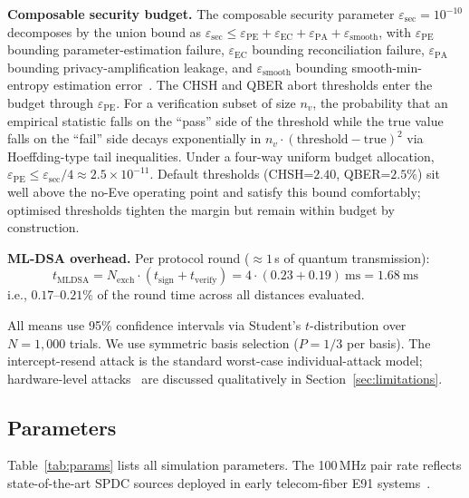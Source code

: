 \documentclass[conference]{IEEEtran}
\begin{document}
\textbf{Composable security budget.} The composable security parameter $\varepsilon_{\mathrm{sec}} = 10^{-10}$ decomposes by the union bound as $\varepsilon_{\mathrm{sec}} \leq \varepsilon_{\mathrm{PE}} + \varepsilon_{\mathrm{EC}} + \varepsilon_{\mathrm{PA}} + \varepsilon_{\mathrm{smooth}}$, with $\varepsilon_{\mathrm{PE}}$ bounding parameter-estimation failure, $\varepsilon_{\mathrm{EC}}$ bounding reconciliation failure, $\varepsilon_{\mathrm{PA}}$ bounding privacy-amplification leakage, and $\varepsilon_{\mathrm{smooth}}$ bounding smooth-min-entropy estimation error~\cite{lim2014,tomamichel2012}. The CHSH and QBER abort thresholds enter the budget through $\varepsilon_{\mathrm{PE}}$. For a verification subset of size $n_v$, the probability that an empirical statistic falls on the ``pass'' side of the threshold while the true value falls on the ``fail'' side decays exponentially in $n_v \cdot (\mathrm{threshold} - \mathrm{true})^2$ via Hoeffding-type tail inequalities. Under a four-way uniform budget allocation, $\varepsilon_{\mathrm{PE}} \leq \varepsilon_{\mathrm{sec}}/4 \approx 2.5 \times 10^{-11}$. Default thresholds (CHSH=$2.40$, QBER=$2.5\%$) sit well above the no-Eve operating point and satisfy this bound comfortably; optimised thresholds tighten the margin but remain within budget by construction.

\textbf{ML-DSA overhead.} Per protocol round ($\approx 1$\,s of quantum transmission):
\begin{equation}
t_{\mathrm{MLDSA}} = N_{\mathrm{exch}} \cdot (t_{\mathrm{sign}} + t_{\mathrm{verify}}) = 4 \cdot (0.23 + 0.19)~\mathrm{ms} = 1.68~\mathrm{ms} \label{eq:mldsa}
\end{equation}
i.e., $0.17$--$0.21\%$ of the round time across all distances evaluated.

All means use 95\% confidence intervals via Student's $t$-distribution over $N = 1{,}000$ trials. We use symmetric basis selection ($P = 1/3$ per basis). The intercept-resend attack is the standard worst-case individual-attack model; hardware-level attacks~\cite{lydersen2010,makarov2009} are discussed qualitatively in Section~\ref{sec:limitations}.

\subsection{Parameters}
Table~\ref{tab:params} lists all simulation parameters. The 100\,MHz pair rate reflects state-of-the-art SPDC sources deployed in early telecom-fiber E91 systems~\cite{poppe2004}.
\end{document}
